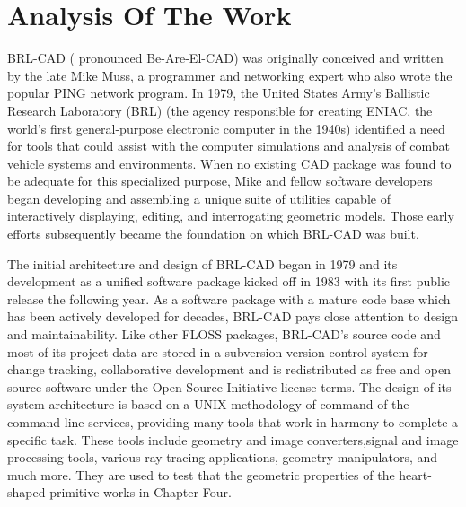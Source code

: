 
\section{Analysis Of The Work}

\hspace{30} BRL­-CAD   (   pronounced   Be­-Are-­El-­CAD)   was   originally   conceived   and  
written   by   the   late   Mike   Muss,   a   programmer   and   networking   expert   who   also  
wrote   the   popular   PING   network   program.   In   1979,   the   United   States   Army's  
Ballistic   Research   Laboratory   (BRL)   (the   agency   responsible   for   creating  
ENIAC,   the   world's   first   general-­purpose   electronic   computer   in   the   1940s)  
identified   a   need   for   tools   that   could   assist   with   the   computer   simulations   and  
analysis   of   combat   vehicle   systems   and   environments.   When   no   existing   CAD  
package   was   found   to   be   adequate   for   this   specialized   purpose,   Mike   and  
fellow   software   developers   began   developing   and   assembling   a   unique   suite   of  
utilities   capable   of   interactively   displaying,   editing,   and   interrogating   geometric  
models.   Those   early   efforts   subsequently   became   the   foundation   on   which  
BRL­-CAD was built.  

\hspace{30} The   initial   architecture   and   design   of   BRL-­CAD   began   in   1979   and   its  
development   as   a   unified   software   package   kicked   off   in   1983   with   its   first  
public   release   the   following   year.   As   a   software   package   with   a   mature   code  
base   which   has   been   actively   developed   for   decades,   BRL-­CAD   pays   close  
attention   to   design   and   maintainability.   Like   other   FLOSS   packages,  
BRL­-CAD's   source   code   and   most   of   its   project   data   are   stored   in   a  
subversion   version   control   system   for   change   tracking,   collaborative  
development   and   is   redistributed   as   free   and   open   source   software   under   the  
Open   Source   Initiative   license   terms.   The   design   of   its   system   architecture   is  
based   on   a   UNIX methodology   of   command   of   the   command ­line   services,  
providing   many   tools   that   work   in   harmony   to   complete   a   specific   task.   These  
tools   include   geometry   and   image   converters,signal   and   image   processing  
tools,   various   ray   tracing   applications, geometry   manipulators,   and   much   more.  
They are used to   test   that   the   geometric   properties   of   the   heart­-shaped  
primitive works in Chapter Four.

